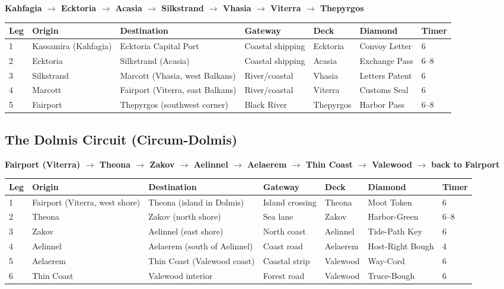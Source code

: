 \documentclass[12pt,oneside]{book}
\begin{document}
\textbf{Kahfagia $\rightarrow$ Ecktoria $\rightarrow$ Acasia $\rightarrow$ Silkstrand $\rightarrow$ Vhasia $\rightarrow$ Viterra $\rightarrow$ Thepyrgos}

\begin{longtable}{|p{1.5cm}|p{2.5cm}|p{2.5cm}|p{1.5cm}|p{2cm}|p{1.5cm}|}
\hline
\textbf{Leg} & \textbf{Origin} & \textbf{Destination} & \textbf{Gateway} & \textbf{Deck} & \textbf{Diamond} & \textbf{Timer} \\
 & Kassamira (Kahfagia) & Ecktoria Capital Port & Coastal shipping & Ecktoria & Convoy Letter & 6 \\
2 & Ecktoria & Silkstrand (Acasia) & Coastal shipping & Acasia & Exchange Pass & 6--8 \\
3 & Silkstrand & Marcott (Vhasia, west Balkans) & River/coastal & Vhasia & Letters Patent & 6 \\
4 & Marcott & Fairport (Viterra, east Balkans) & River/coastal & Viterra & Customs Seal & 6 \\
5 & Fairport & Thepyrgos (southwest corner) & Black River & Thepyrgos & Harbor Pass & 6--8 \\
\hline
\end{longtable}

\subsection{The Dolmis Circuit (Circum-Dolmis)}

\textbf{Fairport (Viterra) $\rightarrow$ Theona $\rightarrow$ Zakov $\rightarrow$ Aelinnel $\rightarrow$ Aelaerem $\rightarrow$ Thin Coast $\rightarrow$ Valewood $\rightarrow$ back to Fairport}

\begin{longtable}{|p{1.5cm}|p{2.5cm}|p{2.5cm}|p{1.5cm}|p{2cm}|p{1.5cm}|}
\hline
\textbf{Leg} & \textbf{Origin} & \textbf{Destination} & \textbf{Gateway} & \textbf{Deck} & \textbf{Diamond} & \textbf{Timer} \\
 & Fairport (Viterra, west shore) & Theona (island in Dolmis) & Island crossing & Theona & Moot Token & 6 \\
2 & Theona & Zakov (north shore) & Sea lane & Zakov & Harbor-Green & 6--8 \\
3 & Zakov & Aelinnel (east shore) & North coast & Aelinnel & Tide-Path Key & 6 \\
4 & Aelinnel & Aelaerem (south of Aelinnel) & Coast road & Aelaerem & Host-Right Bough & 4 \\
5 & Aelaerem & Thin Coast (Valewood coast) & Coastal strip & Valewood & Way-Cord & 6 \\
6 & Thin Coast & Valewood interior & Forest road & Valewood & Truce-Bough & 6 \\
\hline
\end{longtable}
\end{document}
